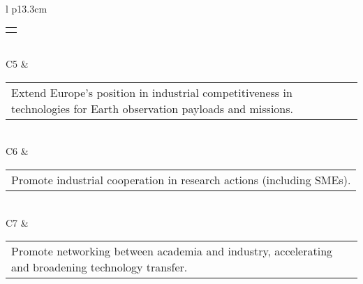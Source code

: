 \begin{longtable}[H]{l p{13.3cm}}
\begin{tabular}[c]{@{}l@{}}
\begin{minipage}[t]{\linewidth}
	\end{minipage} \end{tabular}                                                                                                                                           \\  \midrule
	C5 & \begin{tabular}[c]{@{}l@{}}\begin{minipage}[t]{\linewidth}
Extend Europe's position in industrial competitiveness in technologies for Earth observation payloads and missions. \vspace{0.3cm}
	\end{minipage} \end{tabular}                                                                                                                                             \\  \midrule
	C6 & \begin{tabular}[c]{@{}l@{}}\begin{minipage}[t]{\linewidth}
			Promote industrial cooperation in research actions (including SMEs). \vspace{0.3cm}
	\end{minipage} \end{tabular}                                                                                                                                          \\  \midrule
	C7 & \begin{tabular}[c]{@{}l@{}}\begin{minipage}[t]{\linewidth}
			Promote networking between academia and industry, accelerating and broadening technology transfer. \vspace{0.3cm}
	\end{minipage} \end{tabular}                                                                                                                                             \\                                                                   	\bottomrule[2pt]
	\caption{Call of proposal requirements}
\end{longtable}

